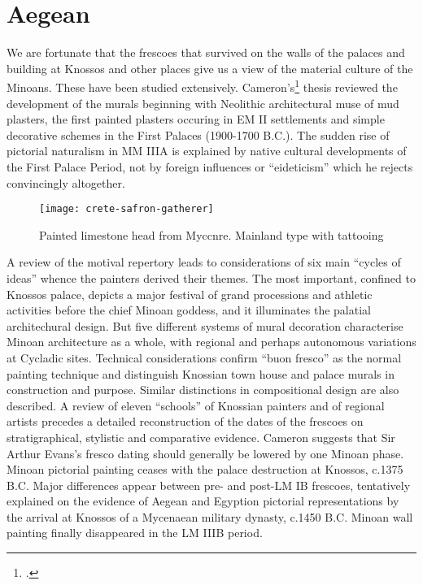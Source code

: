 


\chapter{Aegean}

We are fortunate that the frescoes that survived on the walls of the palaces and building at Knossos and other places give us a view of the material culture of the Minoans. These have been studied extensively. Cameron's\footcite{Cameron1976} thesis reviewed the development of the murals beginning with  Neolithic architectural muse of mud plasters, the first painted plasters occuring in EM II settlements and simple decorative schemes in the First Palaces (1900-1700 B.C.). The sudden rise of pictorial naturalism in MM IIIA is explained by native cultural developments of the First Palace Period, not by foreign influences or \enquote{eideticism}  which he rejects convincingly altogether. 
\begin{figure}[htbp]
\centering
\texttt{[image: crete-safron-gatherer]}
\caption{Painted limestone head from Myccnre. Mainland type with
tattooing}
\end{figure}
A review of the motival repertory leads to considerations of six main \enquote{cycles of ideas} whence the painters derived their themes. The most important, confined to Knossos palace, depicts a major festival of grand processions and athletic activities before the chief Minoan goddess, and it illuminates the palatial architechural design. But five different systems of mural decoration characterise Minoan architecture as a whole, with regional and perhaps autonomous variations at Cycladic sites. Technical considerations confirm \enquote{buon fresco} as the normal painting technique and distinguish Knossian town house and palace murals in construction and purpose. Similar distinctions in compositional design are also described. A review of eleven \enquote{schools} of Knossian painters and of regional artists precedes a detailed reconstruction of the dates of the frescoes on stratigraphical, stylistic and comparative evidence. Cameron suggests that Sir Arthur Evans's fresco dating should generally be lowered by one Minoan phase. Minoan pictorial painting ceases with the palace destruction at Knossos, c.1375 B.C. Major differences appear between pre- and post-LM IB frescoes, tentatively explained on the evidence of Aegean and Egyption pictorial representations by the arrival at Knossos of a Mycenaean military dynasty, c.1450 B.C. Minoan wall painting finally disappeared in the LM IIIB period.

